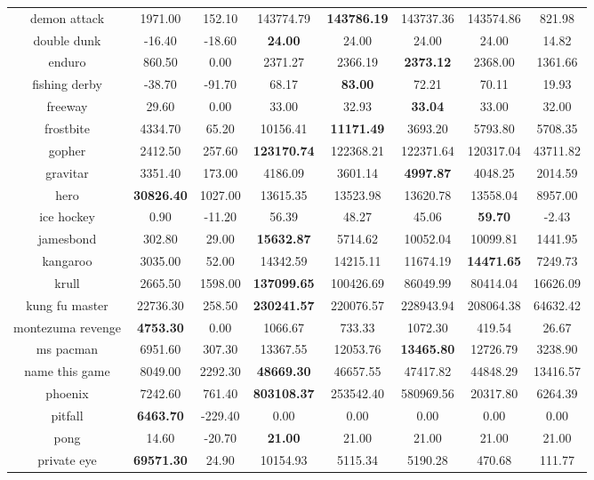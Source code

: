 \documentclass{article}
\begin{document}
\begin{table}[ht]
\begin{tabular}{|c|c|c|c|c|c|c|c|}
 demon attack & 1971.00 & 152.10 & 143774.79 & \bf{143786.19} & 143737.36 & 143574.86 & 821.98 \\
 double dunk & -16.40 & -18.60 & \bf{24.00} & 24.00 & 24.00 & 24.00 & 14.82 \\
 enduro & 860.50 & 0.00 & 2371.27 & 2366.19 & \bf{2373.12} & 2368.00 & 1361.66 \\
 fishing derby & -38.70 & -91.70 & 68.17 & \bf{83.00} & 72.21 & 70.11 & 19.93 \\
 freeway & 29.60 & 0.00 & 33.00 & 32.93 & \bf{33.04} & 33.00 & 32.00 \\
 frostbite & 4334.70 & 65.20 & 10156.41 & \bf{11171.49} & 3693.20 & 5793.80 & 5708.35 \\
 gopher & 2412.50 & 257.60 & \bf{123170.74} & 122368.21 & 122371.64 & 120317.04 & 43711.82 \\
 gravitar & 3351.40 & 173.00 & 4186.09 & 3601.14 & \bf{4997.87} & 4048.25 & 2014.59 \\
 hero & \bf{30826.40} & 1027.00 & 13615.35 & 13523.98 & 13620.78 & 13558.04 & 8957.00 \\
 ice hockey & 0.90 & -11.20 & 56.39 & 48.27 & 45.06 & \bf{59.70} & -2.43 \\
 jamesbond & 302.80 & 29.00 & \bf{15632.87} & 5714.62 & 10052.04 & 10099.81 & 1441.95 \\
 kangaroo & 3035.00 & 52.00 & 14342.59 & 14215.11 & 11674.19 & \bf{14471.65} & 7249.73 \\
 krull & 2665.50 & 1598.00 & \bf{137099.65} & 100426.69 & 86049.99 & 80414.04 & 16626.09 \\
 kung fu master & 22736.30 & 258.50 & \bf{230241.57} & 220076.57 & 228943.94 & 208064.38 & 64632.42 \\
 montezuma revenge & \bf{4753.30} & 0.00 & 1066.67 & 733.33 & 1072.30 & 419.54 & 26.67 \\
 ms pacman & 6951.60 & 307.30 & 13367.55 & 12053.76 & \bf{13465.80} & 12726.79 & 3238.90 \\
 name this game & 8049.00 & 2292.30 & \bf{48669.30} & 46657.55 & 47417.82 & 44848.29 & 13416.57 \\
 phoenix & 7242.60 & 761.40 & \bf{803108.37} & 253542.40 & 580969.56 & 20317.80 & 6264.39 \\
 pitfall & \bf{6463.70} & -229.40 & 0.00 & 0.00 & 0.00 & 0.00 & 0.00 \\
 pong & 14.60 & -20.70 & \bf{21.00} & 21.00 & 21.00 & 21.00 & 21.00 \\
 private eye & \bf{69571.30} & 24.90 & 10154.93 & 5115.34 & 5190.28 & 470.68 & 111.77 \\

\end{tabular}
\end{table}
\end{document}
